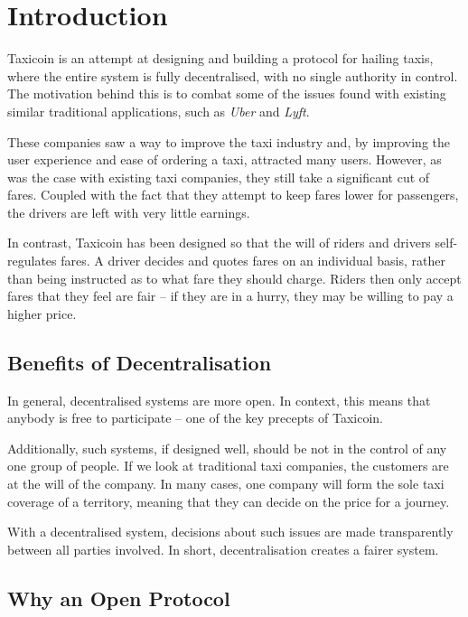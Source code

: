 \section{Introduction}

Taxicoin is an attempt at designing and building a protocol for hailing taxis, where the entire system is fully decentralised, with no single authority in control. The motivation behind this is to combat some of the issues found with existing similar traditional applications, such as \textit{Uber} and \textit{Lyft}.

These companies saw a way to improve the taxi industry and, by improving the user experience and ease of ordering a taxi, attracted many users. However, as was the case with existing taxi companies, they still take a significant cut of fares. Coupled with the fact that they attempt to keep fares lower for passengers, the drivers are left with very little earnings.

In contrast, Taxicoin has been designed so that the will of riders and drivers self-regulates fares. A driver decides and quotes fares on an individual basis, rather than being instructed as to what fare they should charge. Riders then only accept fares that they feel are fair -- if they are in a hurry, they may be willing to pay a higher price.


\subsection{Benefits of Decentralisation}

In general, decentralised systems are more open. In context, this means that anybody is free to participate -- one of the key precepts of Taxicoin.

Additionally, such systems, if designed well, should be not in the control of any one group of people. If we look at traditional taxi companies, the customers are at the will of the company. In many cases, one company will form the sole taxi coverage of a territory, meaning that they can decide on the price for a journey.

With a decentralised system, decisions about such issues are made transparently between all parties involved. In short, decentralisation creates a fairer system.


\subsection{Why an Open Protocol}

